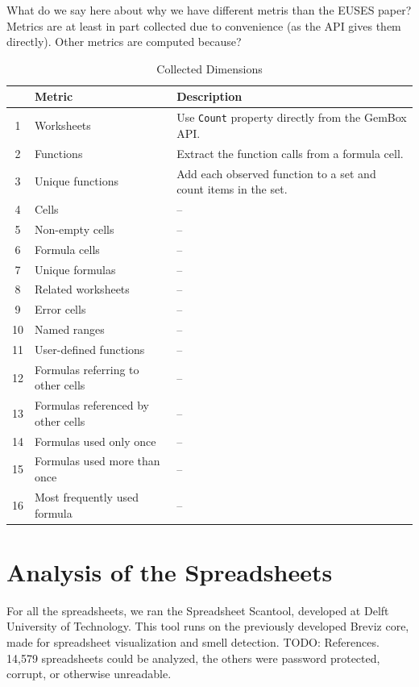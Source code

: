 \documentclass[conference]{IEEEtran}
\begin{document}
What do we say here about why we have different metris than the EUSES paper? Metrics are at least in part collected due to convenience (as the API gives them directly). Other metrics are computed because?

\begin{table}[!t]
	\caption{Collected Dimensions}
	\label{tab:corpusoverview}
	
	\begin{tabularx}{\columnwidth}{clX}
		\toprule
		& \textbf{Metric} & \textbf{Description}\\
		\midrule	  	
	  	1 & Worksheets & Use \texttt{Count} property directly from the GemBox API.\\
	  	2 & Functions & Extract the function calls from a formula cell.\\
	  	3 & Unique functions & Add each observed function to a set and count items in the set.\\
	  	4 & Cells & --\\
	  	5 & Non-empty cells & --\\
	  	6 & Formula cells & --\\
	  	7 & Unique formulas & --\\
	  	8 & Related worksheets & --\\
	  	9 & Error cells & --\\
	  	10 & Named ranges & --\\
	  	11 & User-defined functions & --\\
	  	12 & Formulas referring to other cells & --\\
	  	13 & Formulas referenced by other cells & --\\
	  	14 & Formulas used only once & --\\
	  	15 & Formulas used more than once & --\\
	  	16 & Most frequently used formula & --\\
		\bottomrule
	\end{tabularx}
\end{table}

\section{Analysis of the Spreadsheets}
For all the spreadsheets, we ran the Spreadsheet Scantool, developed at Delft University of Technology. This tool runs on the previously developed Breviz core, made for spreadsheet visualization and smell detection. TODO: References. 14,579 spreadsheets could be analyzed, the others were password protected, corrupt, or otherwise unreadable.
\end{document}
